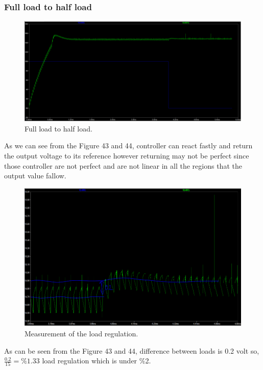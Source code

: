 \documentclass{article}
\begin{document}
\subsubsection{Full load to half load}


\begin{figure}[H]
    \centering
    \includegraphics[scale=0.7]{e2.png}
    \caption{Full load to half load.}
    \label{fig:my_label}
\end{figure}


As we can see from the Figure 43 and 44, controller can react fastly and return the output voltage to its reference however returning may not be perfect since those controller are not perfect and are not linear in all the regions that the output value fallow.



\begin{figure}[H]
    \centering
    \includegraphics[scale=0.7]{e3.png}
    \caption{Measurement of the load regulation.}
    \label{fig:my_label}
\end{figure}
As can be seen from the Figure 43 and 44, difference between loads is 0.2 volt so,
$\frac{0.2}{15}=\%1.33$ load regulation  which is under \%2.
\end{document}
